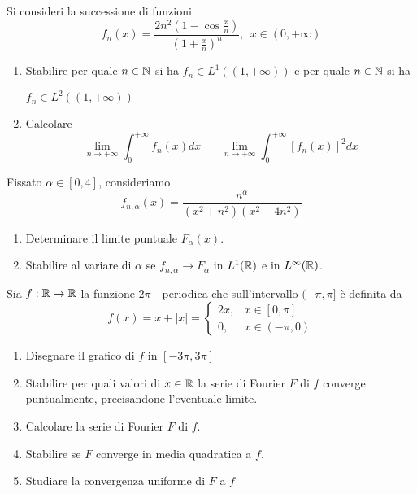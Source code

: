 Si consideri la successione di funzioni
\begin{equation*}
f_{n} (x) = \frac{2n^{2}\left(1 - \cos\frac{x}{n}\right)}{\left(1 + \frac{x}{n}\right)^{n}}, \ \ x\in (0, + \infty)
\end{equation*}
\begin{enumerate}
\item Stabilire per quale $n\in \mathbb{N} $ si ha $f_{n} \in L^{1}((1, + \infty))$ e per quale $n\in \mathbb{N} $ si ha

$f_{n} \in L^{2}((1, + \infty))$
\item Calcolare
\begin{equation*}
\lim\limits_{n\rightarrow + \infty}\int^{+ \infty}_{0} f_{n}(x) dx\ \ \ \ \ \ \ \ \lim\limits_{n\rightarrow + \infty}\int^{+ \infty}_{0}[ f_{n}(x)]^{2} dx
\end{equation*}
\end{enumerate}

\Esercizio{}

Fissato $\alpha \in [ 0, 4]$, consideriamo
\begin{equation*}
f_{n, \alpha}(x) = \frac{n^{\alpha}}{\left(x^{2} + n^{2}\right)\left(x^{2} + 4n^{2}\right)}
\end{equation*}
\begin{enumerate}
\item Determinare il limite puntuale $F_{\alpha}(x)$.
\item Stabilire al variare di $\alpha $ se $f_{n, \alpha}\rightarrow F_{\alpha}$ in $L^{1}(\mathbb{R})$ e in $L^{\infty}(\mathbb{R})$.
\end{enumerate}

\Esercizio{}

Sia $f:\mathbb{R} \rightarrow \mathbb{R} $ la funzione $2\pi $ - periodica che sull'intervallo $(- \pi, \pi ]$ è definita da
\begin{equation*}
f(x) = x + | x| =
\begin{cases}
2x, & x\in [ 0, \pi ]\\
0, & x\in (- \pi, 0)
\end{cases}
\end{equation*}
\begin{enumerate}
\item Disegnare il grafico di $f$ in $[ - 3\pi, 3\pi ]$
\item Stabilire per quali valori di $x\in \mathbb{R} $ la serie di Fourier $F$ di $f$ converge puntualmente, precisandone l'eventuale limite.
\item Calcolare la serie di Fourier $F$ di $f$.
\item Stabilire se $F$ converge in media quadratica a $f$.
\item Studiare la convergenza uniforme di $F$ a $f$
\end{enumerate}

